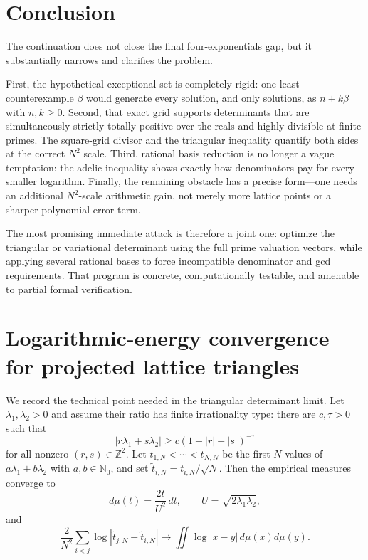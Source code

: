 \documentclass[11pt]{article}
\theoremstyle{definition}
\newcommand{\Nzero}{\mathbb N_0}
\newcommand{\Z}{\mathbb Z}
\begin{document}
\section{Conclusion}

The continuation does not close the final four-exponentials gap, but it
substantially narrows and clarifies the problem.

First, the hypothetical exceptional set is completely rigid: one least
counterexample $\beta$ would generate every solution, and only solutions, as
$n+k\beta$ with $n,k\ge0$.  Second, that exact grid supports determinants that
are simultaneously strictly totally positive over the reals and highly
divisible at finite primes.  The square-grid divisor and the triangular
inequality quantify both sides at the correct $N^2$ scale.  Third, rational
basis reduction is no longer a vague temptation: the adelic inequality shows
exactly how denominators pay for every smaller logarithm.  Finally, the
remaining obstacle has a precise form---one needs an additional $N^2$-scale
arithmetic gain, not merely more lattice points or a sharper polynomial error
term.

The most promising immediate attack is therefore a joint one: optimize the
triangular or variational determinant using the full prime valuation vectors,
while applying several rational bases to force incompatible denominator and
gcd requirements.  That program is concrete, computationally testable, and
amenable to partial formal verification.

\appendix

\section{Logarithmic-energy convergence for projected lattice triangles}
\label{app:energy-convergence}

We record the technical point needed in the triangular determinant limit.  Let
$\lambda_1,\lambda_2>0$ and assume their ratio has finite irrationality type:
there are $c,\tau>0$ such that
\[
 |r\lambda_1+s\lambda_2|\ge c(1+|r|+|s|)^{-\tau}
\]
for all nonzero $(r,s)\in\Z^2$.  Let $t_{1,N}<\cdots<t_{N,N}$ be the first $N$
values of $a\lambda_1+b\lambda_2$ with $a,b\in\Nzero$, and set
$\widetilde t_{i,N}=t_{i,N}/\sqrt N$.  Then the empirical measures converge to
\[
 d\mu(t)=\frac{2t}{U^2}\,dt,\qquad U=\sqrt{2\lambda_1\lambda_2},
\]
and
\begin{equation}\label{eq:energy-limit-app}
 \frac{2}{N^2}\sum_{i<j}\log|\widetilde t_{j,N}-\widetilde t_{i,N}|
 \longrightarrow\iint\log|x-y|\,d\mu(x)d\mu(y).
\end{equation}
\end{document}
